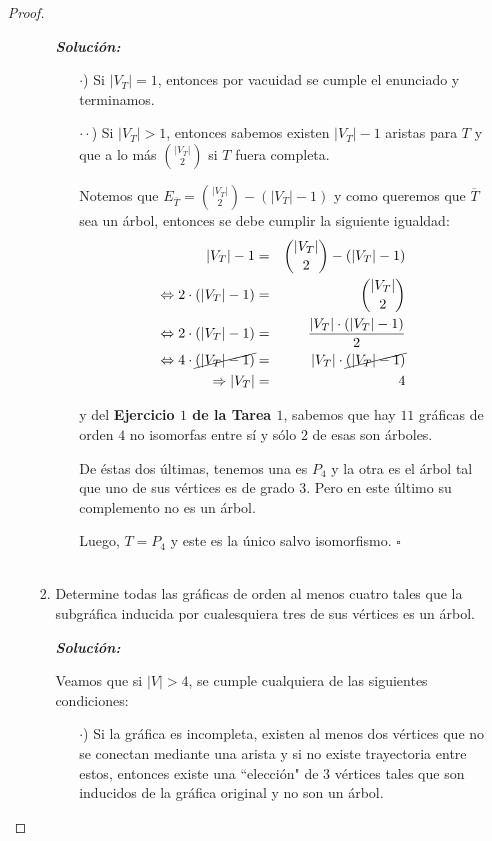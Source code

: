 \documentclass{article}
\begin{document}
\begin{enumerate}
\begin{proof}
\begin{enumerate}
\begin{enumerate}
        \textbf{\textit{Soluci\'on:}}
        \begin{itemize}
          \item[$\cdot$)]  Si $|V_T| = 1$, entonces por vacuidad se cumple
            el enunciado y terminamos.
          \item[$\cdot \cdot$)] Si $|V_T| > 1$, entonces sabemos existen $|V_T| -1$
            aristas para $T$ y que a lo más ${|V_T| \choose 2}$ si $T$ fuera
            completa.

            Notemos que $E_{\overline{T}} = {|V_T| \choose 2} - (|V_T| -1)$ y
            como queremos que $\overline{T}$ sea un árbol, entonces se debe cumplir
            la siguiente igualdad:
            \begin{eqnarray*}
              |V_T| -1 &=& {|V_T| \choose 2} - (|V_T| -1)\\
              \Leftrightarrow 2 \cdot (|V_T| -1) &=& {|V_T| \choose 2}\\
              \Leftrightarrow 2 \cdot (|V_T| -1) &=& \frac{|V_T| \cdot (|V_T| -1)}{2}\\
              \Leftrightarrow 4 \cdot \cancel{(|V_T| -1)} &=& |V_T| \cdot \cancel{(|V_T| -1)}\\
              \Rightarrow |V_T| &=& 4
            \end{eqnarray*}

            y del \textbf{Ejercicio $1$ de la Tarea $1$}, sabemos que hay $11$ gráficas
            de orden $4$ no isomorfas entre sí y sólo $2$ de esas son árboles.

            De \'estas dos \'ultimas, tenemos una es $P_4$ y la otra es el árbol
            tal que uno de sus vértices es de grado $3$. Pero en este último su
            complemento no es un árbol.

            Luego, $T = P_4$ y este es la único salvo isomorfismo.
            \hfill $\square$ \\
            \\
        \end{itemize}

      \item Determine todas las gr\'aficas de orden al
        menos cuatro tales que la subgr\'afica inducida por
        cualesquiera tres de sus v\'ertices es un \'arbol.

        \textbf{\textit{Soluci\'on:}}

        Veamos que si $|V| > 4$, se cumple cualquiera de las siguientes condiciones:
        \begin{itemize}
          \item[$\cdot$)] Si la gráfica es incompleta, existen al menos dos vértices
            que no se conectan mediante una arista y si no existe trayectoria entre estos,
            entonces existe una ``elección" de $3$ vértices tales que son inducidos de
            la gráfica original y no son un árbol.


\end{itemize}
\end{enumerate}
\end{enumerate}
\end{proof}
\end{enumerate}
\end{document}
